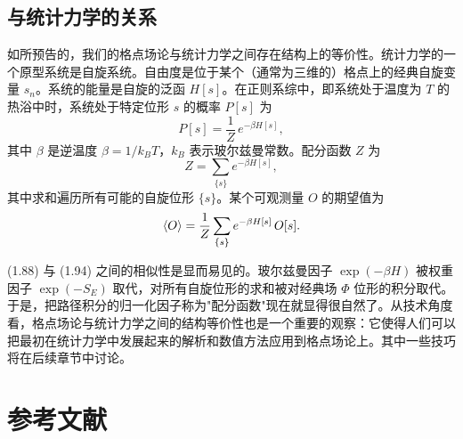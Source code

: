 \subsection{与统计力学的关系}

如所预告的，我们的格点场论与统计力学之间存在结构上的等价性。统计力学的一个原型系统是自旋系统。自由度是位于某个（通常为三维的）格点上的经典自旋变量 $s_n$。系统的能量是自旋的泛函 $H[s]$。在正则系综中，即系统处于温度为 $T$ 的热浴中时，系统处于特定位形 $s$ 的概率 $P[s]$ 为
\begin{equation}
  P[s] = \frac{1}{Z}\,e^{-\beta H[s]},
\end{equation}
其中 $\beta$ 是逆温度 $\beta = 1/k_B T$，$k_B$ 表示玻尔兹曼常数。配分函数 $Z$ 为
\begin{equation}
  Z = \sum_{\{s\}}e^{-\beta H[s]},
\end{equation}
其中求和遍历所有可能的自旋位形 $\{s\}$。某个可观测量 $O$ 的期望值为
\begin{equation}
  \left\langle O \right\rangle = \frac{1}{Z}\sum_{\{s\}}e^{-\beta H[s]}\,O[s].
\end{equation}

(1.88) 与 (1.94) 之间的相似性是显而易见的。玻尔兹曼因子 $\exp(-\beta H)$ 被权重因子 $\exp(-S_E)$ 取代，对所有自旋位形的求和被对经典场 $\Phi$ 位形的积分取代。于是，把路径积分的归一化因子称为"配分函数"现在就显得很自然了。从技术角度看，格点场论与统计力学之间的结构等价性也是一个重要的观察：它使得人们可以把最初在统计力学中发展起来的解析和数值方法应用到格点场论上。其中一些技巧将在后续章节中讨论。

\section*{参考文献}

